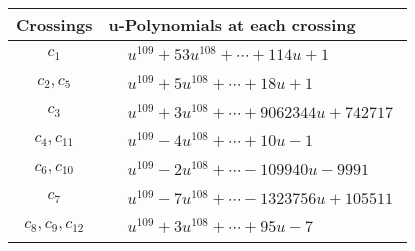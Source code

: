 \documentclass[1p]{elsarticle_modified}
\theoremstyle{definition}
\begin{document}
\begin{tabular}{m{50pt}|m{274pt}}
Crossings & \hspace{64pt}u-Polynomials at each crossing \\
\hline $$\begin{aligned}c_{1}\end{aligned}$$&$\begin{aligned}
&u^{109}+53 u^{108}+\cdots+114 u+1
\end{aligned}$\\
\hline $$\begin{aligned}c_{2},c_{5}\end{aligned}$$&$\begin{aligned}
&u^{109}+5 u^{108}+\cdots+18 u+1
\end{aligned}$\\
\hline $$\begin{aligned}c_{3}\end{aligned}$$&$\begin{aligned}
&u^{109}+3 u^{108}+\cdots+9062344 u+742717
\end{aligned}$\\
\hline $$\begin{aligned}c_{4},c_{11}\end{aligned}$$&$\begin{aligned}
&u^{109}-4 u^{108}+\cdots+10 u-1
\end{aligned}$\\
\hline $$\begin{aligned}c_{6},c_{10}\end{aligned}$$&$\begin{aligned}
&u^{109}-2 u^{108}+\cdots-109940 u-9991
\end{aligned}$\\
\hline $$\begin{aligned}c_{7}\end{aligned}$$&$\begin{aligned}
&u^{109}-7 u^{108}+\cdots-1323756 u+105511
\end{aligned}$\\
\hline $$\begin{aligned}c_{8},c_{9},c_{12}\end{aligned}$$&$\begin{aligned}
&u^{109}+3 u^{108}+\cdots+95 u-7
\end{aligned}$\\
\hline
\end{tabular}\\~\\
\end{document}
